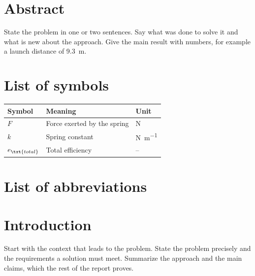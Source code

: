 \documentclass[a4paper, 11pt]{article}
\begin{document}
\makecover

\frontmatter
\section*{Abstract}
State the problem in one or two sentences.
Say what was done to solve it and what is new about the approach.
Give the main result with numbers, for example a launch distance of \SI{9.3}{\metre}.

\tableofcontents
\clearpage

\section*{List of symbols}
\label{sec:symbols}
\begin{table}[H]
  \centering
  \begin{tabular}{m{} m{} m{}}
    \toprule
    \textbf{Symbol} & \textbf{Meaning} & \textbf{Unit} \\
    \midrule
    $F$ & Force exerted by the spring & \si{\newton} \\
    $k$ & Spring constant & \si{\newton\per\metre} \\
    $e_\txt{total}$ & Total efficiency & -- \\
    \bottomrule
  \end{tabular}
\end{table}

\section*{List of abbreviations}
\begin{acronym}[SOC]
\end{acronym}


\mainmatter
\section{Introduction}
\label{sec:introduction}
Start with the context that leads to the problem.
State the problem precisely and the requirements a solution must meet.
Summarize the approach and the main claims, which the rest of the report proves.
\end{document}
